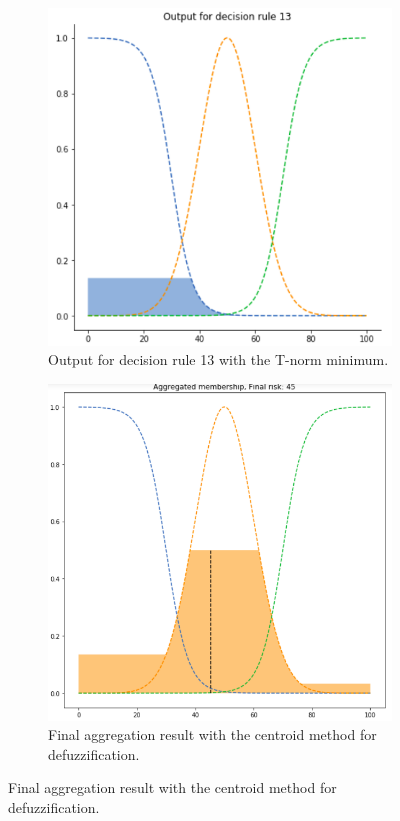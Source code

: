\begin{figure}[ht]
\begin{subfigure}{.5\textwidth}
\end{subfigure}
\begin{subfigure}{.5\textwidth}
  \centering
  \includegraphics[width=.8\linewidth]{figures/second/min3.png}  
  \caption{Output for decision rule 13 with the T-norm minimum.}
  \label{fig:2min3}
\end{subfigure}
\begin{subfigure}{.5\textwidth}
  \centering
  \includegraphics[width=.8\linewidth]{figures/second/min-centroid.png}  
  \caption{Final aggregation result with the centroid method for defuzzification.}
  \label{fig:2min-centroid}

\end{subfigure}
\end{figure}
